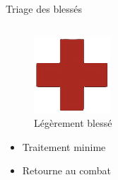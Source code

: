 \documentclass{beamer}
\renewcommand{\tiny}{\fontsize{6pt}{7pt}\selectfont}
\renewcommand{\normalsize}{\fontsize{10pt}{12pt}\selectfont}
\renewcommand{\Large}{\fontsize{20pt}{33pt}\selectfont}
\begin{document}
				\begin{frame}
					\Large Triage des blessés \\
					\vskip0.7cm
					\normalsize\itshape
					\begin{columns}
						\begin{column}{0.3\linewidth}
							\begin{figure}
								\includegraphics[width=0.8\linewidth]{pics/II3a}

								\caption{\tiny Légèrement blessé}
							\end{figure}
							\begin{itemize}
								\item Traitement minime
								\item Retourne au combat
							\end{itemize}
						\end{column}
					

\end{columns}
\end{frame}
\end{document}
